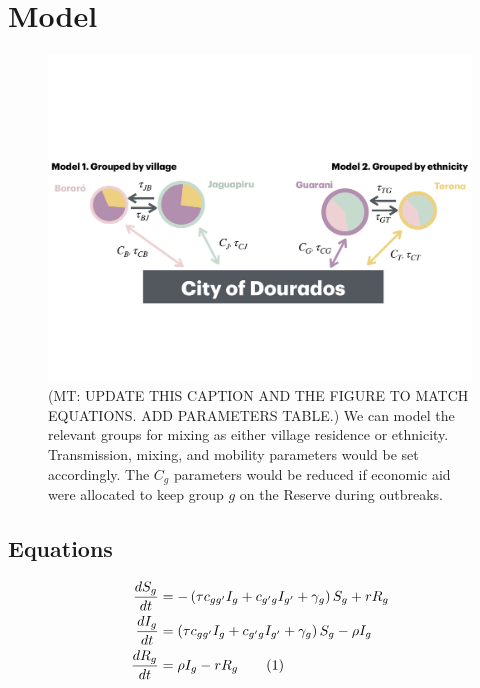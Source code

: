 \documentclass[
  letterpaper,
  abstract]{scrartcl}
\newcommand{\mt}[1]{{\textcolor{myorange} {({\tiny MT:} #1)}}}
\newcommand\numberthis{\addtocounter{equation}{1}\tag{\theequation}}
\begin{document}
\section{Model}\label{model}

\begin{figure}[H]

{\centering \includegraphics{Figures/ModelSketch.pdf}

}

\caption{\mt{UPDATE THIS CAPTION AND THE FIGURE TO MATCH EQUATIONS. ADD PARAMETERS TABLE.}
  We can model the relevant groups for mixing as either village
residence or ethnicity. Transmission, mixing, and mobility parameters
would be set accordingly. The \(C_g\) parameters would be reduced if
economic aid were allocated to keep group \(g\) on the Reserve during
outbreaks.}

\end{figure}%

\subsection{Equations}\label{equations}

\begin{align*}
  \frac{dS_g}{dt} &= -\left(\tau c_{gg'} I_g + c_{g'g}I_{g'} + \gamma_g \right)S_g + r R_g   \\
  \frac{dI_g}{dt} &= \left(\tau c_{gg'} I_g + c_{g'g}I_{g'} + \gamma_g \right)S_g - \rho I_g \\
  \frac{dR_g}{dt} &= \rho I_g - r R_g
    \numberthis \label{eq:DiseaseContagion}
\end{align*}
\noindent
\end{document}
